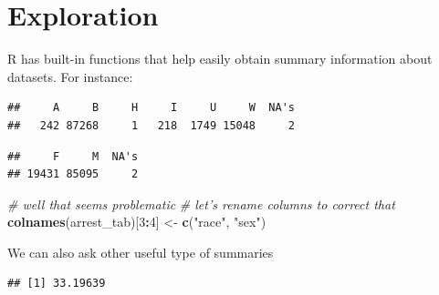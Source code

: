 \documentclass[12pt,]{book}
\newenvironment{Shaded}{\begin{snugshade}}{\end{snugshade}}
\newcommand{\KeywordTok}[1]{\textcolor[rgb]{0.13,0.29,0.53}{\textbf{#1}}}
\newcommand{\DecValTok}[1]{\textcolor[rgb]{0.00,0.00,0.81}{#1}}
\newcommand{\StringTok}[1]{\textcolor[rgb]{0.31,0.60,0.02}{#1}}
\newcommand{\CommentTok}[1]{\textcolor[rgb]{0.56,0.35,0.01}{\textit{#1}}}
\newcommand{\OperatorTok}[1]{\textcolor[rgb]{0.81,0.36,0.00}{\textbf{#1}}}
\newcommand{\NormalTok}[1]{#1}
\theoremstyle{definition}
\theoremstyle{definition}
\theoremstyle{definition}
\theoremstyle{remark}
\begin{document}
\section{Exploration}\label{exploration}

R has built-in functions that help easily obtain summary information
about datasets. For instance:

\begin{Shaded}
\end{Shaded}

\begin{verbatim}
##     A     B     H     I     U     W  NA's 
##   242 87268     1   218  1749 15048     2
\end{verbatim}

\begin{Shaded}
\end{Shaded}

\begin{verbatim}
##     F     M  NA's 
## 19431 85095     2
\end{verbatim}

\begin{Shaded}
\begin{Highlighting}[]
\CommentTok{# well that seems problematic}
\CommentTok{# let's rename columns to correct that}
\KeywordTok{colnames}\NormalTok{(arrest_tab)[}\DecValTok{3}\OperatorTok{:}\DecValTok{4}\NormalTok{] <-}\StringTok{ }\KeywordTok{c}\NormalTok{(}\StringTok{"race"}\NormalTok{, }\StringTok{"sex"}\NormalTok{)}
\end{Highlighting}
\end{Shaded}

We can also ask other useful type of summaries

\begin{Shaded}
\end{Shaded}

\begin{verbatim}
## [1] 33.19639
\end{verbatim}
\end{document}
